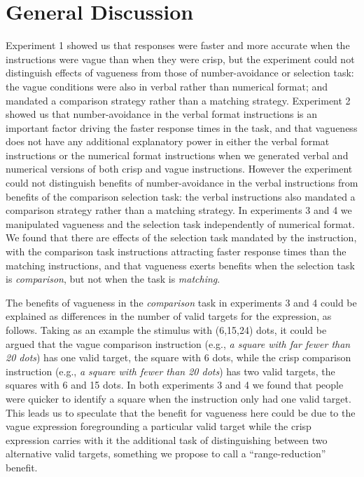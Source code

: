\documentclass[
a4paper 
, doc
, longtable
]{apa6}
\begin{document}
\section{General Discussion}

Experiment 1 showed us that responses were faster and more accurate when the instructions were vague than when they were crisp, but the experiment could not distinguish effects of vagueness from those of number-avoidance or selection task: the vague conditions were also in verbal rather than numerical format; and mandated a comparison strategy rather than a matching strategy.  Experiment 2 showed us that number-avoidance in the verbal format instructions is an important factor driving the faster response times in the task, and that vagueness does not have any additional explanatory power in either the verbal format instructions or the numerical format instructions when we generated verbal and numerical versions of both crisp and vague instructions. However the experiment could not distinguish benefits of number-avoidance in the verbal instructions from benefits of the comparison selection task: the verbal instructions also mandated a comparison strategy rather than a matching strategy. In experiments 3 and 4 we manipulated vagueness and the selection task independently of numerical format. We found that there are effects of the selection task mandated by the instruction, with the comparison task instructions attracting faster response times than the matching instructions, and that vagueness exerts benefits when the selection task is \emph{comparison}, but not when the task is \emph{matching}.

The benefits of vagueness in the \emph{comparison} task in experiments 3 and 4 could be explained as differences in the number of valid targets for the expression, as follows. Taking as an example the stimulus with (6,15,24) dots, it could be argued that the vague comparison instruction (e.g., \emph{a square with far fewer than 20 dots}) has one valid target, the square with 6 dots, while the crisp comparison instruction (e.g., \emph{a square with fewer than 20 dots}) has two valid targets, the squares with 6 and 15 dots. In both experiments 3 and 4 we found that people were quicker to identify a square when the instruction only had one valid target. This leads us to speculate that the benefit for vagueness here could be due to the vague expression foregrounding a particular valid target while the crisp expression carries with it the additional task of distinguishing between two alternative valid targets, something we propose to call a ``range-reduction'' benefit.
\end{document}
